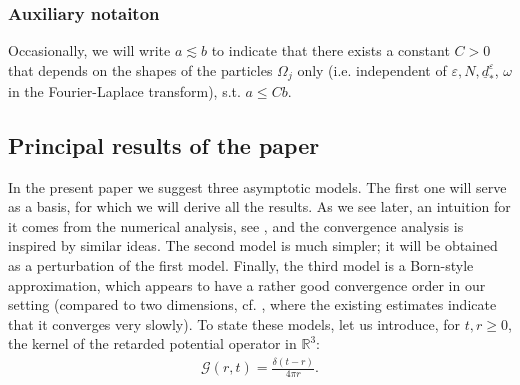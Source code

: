 \documentclass[]{article}
\numberwithin{equation}{section}
\numberwithin{theorem}{section}
\numberwithin{lemma}{section}
\numberwithin{corollary}{section}
\numberwithin{proposition}{section}
\numberwithin{definition}{section}
\newcommand{\re}{\varepsilon}
\begin{document}
	\subsubsection{Auxiliary notaiton}
	Occasionally, we will write $a \lesssim b$ to indicate that there exists a constant $C>0$ that depends on the shapes of the particles $\Omega_j$ only (i.e. independent of $\re, N, \underline{d}^{\re}_{*}$, $\omega$ in the Fourier-Laplace transform), s.t. $a\leq Cb$. 
	\subsection{Principal results of the paper}
	\label{sec:principal_result}
	
	In the present paper we suggest three asymptotic models. The first one will serve as a basis, for which we will derive all the results. As we see later, an intuition for it comes from the numerical analysis, see \cite{MK}, and the convergence analysis is inspired by similar ideas. The second model is much simpler; it will be obtained as a perturbation of the first model.  Finally, the third model is a Born-style approximation, which appears to have a rather good convergence order in our setting (compared to two dimensions, cf. \cite{hazard_cassier}, where the existing estimates indicate that it converges very slowly). To state these models, let us introduce, for $t, r \geq 0$, the kernel of the retarded potential operator in $\mathbb{R}^3$:
	\begin{align*}%
		\mathcal{G} (r, t) = \frac{\delta(t -r)}{4\pi r}.
	\end{align*} 
\end{document}
